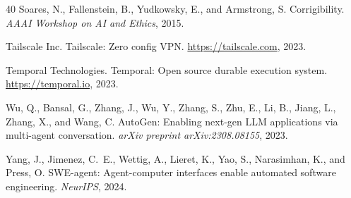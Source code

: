 \begin{thebibliography}{40}
Soares, N., Fallenstein, B., Yudkowsky, E., and Armstrong, S.
\newblock Corrigibility.
\newblock \emph{AAAI Workshop on AI and Ethics}, 2015.

Tailscale Inc.
\newblock Tailscale: Zero config VPN.
\newblock \url{https://tailscale.com}, 2023.

Temporal Technologies.
\newblock Temporal: Open source durable execution system.
\newblock \url{https://temporal.io}, 2023.

Wu, Q., Bansal, G., Zhang, J., Wu, Y., Zhang, S., Zhu, E., Li, B., Jiang, L.,
  Zhang, X., and Wang, C.
\newblock AutoGen: Enabling next-gen LLM applications via multi-agent conversation.
\newblock \emph{arXiv preprint arXiv:2308.08155}, 2023.

Yang, J., Jimenez, C.~E., Wettig, A., Lieret, K., Yao, S., Narasimhan, K.,
  and Press, O.
\newblock SWE-agent: Agent-computer interfaces enable automated software
  engineering.
\newblock \emph{NeurIPS}, 2024.

\end{thebibliography}

